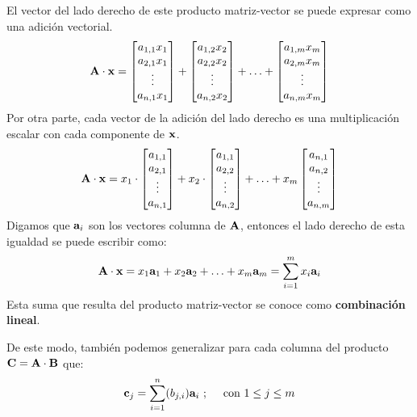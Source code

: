 \documentclass[12pt]{article}
\begin{document}
El vector del lado derecho de este producto matriz-vector se puede expresar como una adición vectorial.
\[
\mathbf{A} \cdot \mathbf{x} =
\begin{bmatrix}
a_{1, 1} x_{1} \\ a_{2, 1}x_{1} \\ \vdots \\ a_{n, 1}x_{1}
\end{bmatrix} +
\begin{bmatrix}
a_{1, 2} x_{2} \\ a_{2, 2}x_{2} \\ \vdots \\ a_{n, 2}x_{2}
\end{bmatrix} +
\ldots +
\begin{bmatrix}
a_{1, m} x_{m} \\ a_{2, m}x_{m} \\ \vdots \\ a_{n, m}x_{m}
\end{bmatrix}
\]
Por otra parte, cada vector de la adición del lado derecho es una multiplicación escalar con cada componente de $\mathbf{x}$.
\[
\mathbf{A} \cdot \mathbf{x} =
x_{1} \cdot
\begin{bmatrix}
a_{1, 1} \\ a_{2, 1} \\ \vdots \\ a_{n, 1}
\end{bmatrix} +
x_{2} \cdot
\begin{bmatrix}
a_{1, 1} \\ a_{2, 2} \\ \vdots \\ a_{n, 2}
\end{bmatrix} +
\ldots +
x_{m}
\begin{bmatrix}
a_{n, 1} \\ a_{n, 2} \\ \vdots \\ a_{n, m}
\end{bmatrix}
\]
Digamos que $\mathbf{a}_{i}$ son los vectores columna de $\mathbf{A}$, entonces el lado derecho de esta igualdad se puede escribir como:
\[
  \mathbf{A} \cdot \mathbf{x} = x_{1}\mathbf{a}_{1} + x_{2}\mathbf{a}_{2} + \ldots + x_{m}\mathbf{a}_{m}
                              = \sum_{i = 1}^{m} x_{i}\mathbf{a}_{i}
\]
Esta suma que resulta del producto matriz-vector se conoce como \textbf{combinación lineal}.

De este modo, también podemos generalizar para cada columna del producto $\mathbf{C} = \mathbf{A} \cdot \mathbf{B}$ que:
\[
  \mathbf{c}_{j} = \sum_{i = 1}^{n} (b_{j, i}) \mathbf{a}_{i} \ ; \quad \text{ con } 1 \leq j \leq m
\]
\end{document}
